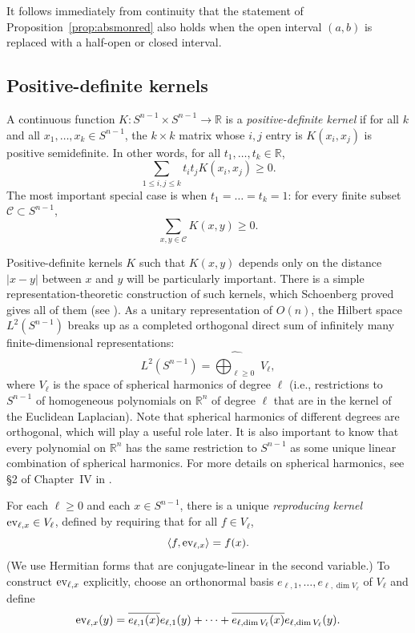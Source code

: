 \documentclass{jams-l}
\theoremstyle{plain}
\numberwithin{theorem}{section}
\theoremstyle{definition}
\numberwithin{equation}{section}
\newcommand{\R}{{\mathbb R}}
\newcommand{\ev}{\mathop{\textup{ev}}\nolimits}
\newcommand{\CodeS}{\mathcal{C}}
\newcommand{\co}{\colon}
\begin{document}
It follows immediately from continuity that the statement of
Proposition~\ref{prop:absmonred} also holds when the open interval
$(a,b)$ is replaced with a half-open or closed interval.

\subsection{Positive-definite kernels}
\label{subsec:pdk}

A continuous function $K \co S^{n-1} \times S^{n-1} \to \R$ is a
\textit{positive-definite kernel\/} if for all $k$ and all
$x_1,\dots,x_k \in S^{n-1}$, the $k \times k$ matrix whose $i,j$
entry is $K(x_i,x_j )$ is positive semidefinite.  In other words,
for all $t_1,\dots,t_k \in \R$,
$$
\sum_{1 \le i,j \le k} t_i t_j K(x_i,x_j) \ge 0.
$$
The most important special case is when $t_1 = \dots = t_k = 1$:
for every finite subset $\CodeS \subset S^{n-1}$,
$$
\sum_{x,y \in \CodeS} K(x,y) \ge 0.
$$

Positive-definite kernels $K$ such that $K(x,y)$ depends only on
the distance $|x-y|$ between $x$ and $y$ will be particularly
important. There is a simple representation-theoretic construction
of such kernels, which Schoenberg proved gives all of them (see
\cite{S}).  As a unitary representation of $O(n)$, the Hilbert
space $L^2(S^{n-1})$ breaks up as a completed orthogonal direct
sum of infinitely many finite-dimensional representations:
$$
L^2(S^{n-1}) = \widehat{\bigoplus_{\ell \ge 0}} \,\, V_\ell,
$$
where $V_\ell$ is the space of spherical harmonics of degree
$\ell$ (i.e., restrictions to $S^{n-1}$ of homogeneous polynomials
on $\R^n$ of degree $\ell$ that are in the kernel of the Euclidean
Laplacian). Note that spherical harmonics of different degrees are
orthogonal, which will play a useful role later.  It is also
important to know that every polynomial on $\R^n$ has the same
restriction to $S^{n-1}$ as some unique linear combination of
spherical harmonics. For more details on spherical harmonics, see
\S{}2 of Chapter~IV in \cite{StW}.

For each $\ell \ge 0$ and each $x \in S^{n-1}$, there is a unique
\textit{reproducing kernel\/} $\ev_{\ell,x} \in V_\ell$, defined
by requiring that for all $f \in V_\ell$,
$$
\langle f, \ev_{\ell,x}\rangle = f(x).
$$
(We use Hermitian forms that are conjugate-linear in the second
variable.)  To construct $\ev_{\ell,x}$ explicitly, choose an
orthonormal basis $e_{\ell,1},\dots,e_{\ell,\dim V_\ell}$ of
$V_\ell$ and define
$$
\ev_{\ell,x}(y) = \overline{e_{\ell,1}(x)}e_{\ell,1}(y) + \dots +
\overline{e_{\ell,\dim V_\ell}(x)}e_{\ell,\dim V_\ell}(y).
$$
\end{document}

